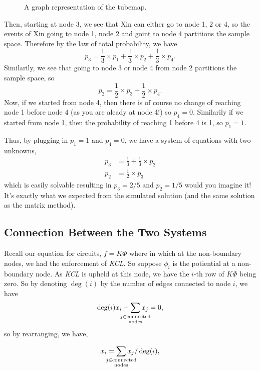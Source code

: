 \documentclass[]{article}
\begin{document}
\begin{figure}
\begin{tikzpicture}[x=0.75pt,y=0.75pt,yscale=-1,xscale=1]
\end{tikzpicture}
\caption{A graph representation of the tubemap.}
\end{figure}

Then, starting at node 3, we see that Xin can either go to node 1, 2 or
4, so the events of Xin going to node 1, node 2 and goint to node 4
partitions the sample space. Therefore by the law of total probability,
we have \[
p_3 = \frac{1}{3} \times p_1 + \frac{1}{3} \times p_2 + \frac{1}{3} \times p_4.
\] Similarily, we see that going to node 3 or node 4 from node 2
partitions the sample space, so \[
p_2 = \frac{1}{2} \times p_3 + \frac{1}{2} \times p_4.
\] Now, if we started from node 4, then there is of course no change of
reaching node 1 before node 4 (as you are aleady at node 4!) so
\(p_4 = 0\). Similarily if we started from node 1, then the probability
of reaching 1 before 4 is 1, so \(p_1 = 1\).

Thus, by plugging in \(p_1 = 1\) and \(p_4 = 0\), we have a system of
equations with two unknowns, \[
\begin{split}
p_3 & = \frac{1}{3} + \frac{1}{3} \times p_2 \\
p_2 & = \frac{1}{2} \times p_3
\end{split}
\] which is easily solvable resulting in \(p_3 = 2 / 5\) and
\(p_2 = 1 / 5\) would you imagine it! It's exactly what we expected from
the simulated solution (and the same solution as the matrix method).

\subsection{Connection Between the Two
Systems}\label{connection-between-the-two-systems}

Recall our equation for circuits, \(f = K \Phi\) where in which at the
non-boundary nodes, we had the enforcement of \emph{KCL}. So suppose
\(\phi_i\) is the potiential at a non-boundary node. As \emph{KCL} is
upheld at this node, we have the \(i\)-th row of \(K \Phi\) being zero.
So by denoting \(\deg(i)\) by the number of edges connected to node
\(i\), we have \[
\deg(i) x_i - \sum_{\mathclap{\substack{j \in \text{connected}\\ \text{nodes}}}} x_j = 0,
\] so by rearranging, we have,

\begin{equation}
x_i = \sum_{\mathclap{\substack{j \in \text{connected}\\ \text{nodes}}}} x_j/ \deg(i),
\end{equation}
\end{document}
